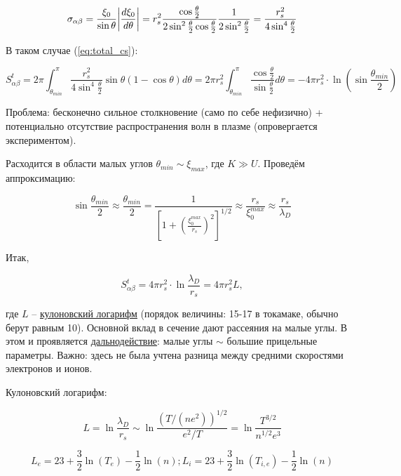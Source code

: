 \documentclass[10pt, a4paper]{article}
\numberwithin{equation}{section}
\begin{document}
\begin{equation*}
	\sigma_{\alpha\beta} = \frac{\xi_0}{\sin\theta}\abs{\frac{d\xi_0}{d\theta}} = r_s^2\frac{\cos\frac{\theta}{2}}{2\sin^2\frac{\theta}{2}\cos\frac{\theta}{2}}\frac{1}{2\sin^2\frac{\theta}{2}} = \frac{r_s^2}{4\sin^4\frac{\theta}{2}}
\end{equation*}

В таком случае (\ref{eq:total_cs}):

\begin{equation*}
	S_{\alpha\beta}^t = 2\pi\int_{\theta_{min}}^{\pi}\frac{r_s^2}{4\sin^4\frac{\theta}{2}}\sin\theta(1-\cos\theta)d\theta = 2\pi r_s^2\int_{\theta_{min}}^{\pi} \frac{\cos\frac{\theta}{2}}{\sin\frac{\theta}{2}}d\theta = -4\pi r_s^2 \cdot \ln\left( \sin\frac{\theta_{min}}{2}\right) 
\end{equation*}

Проблема: бесконечно сильное столкновение (само по себе нефизично) + потенциально отсутствие распространения волн в плазме (опровергается экспериментом).

Расходится в области малых углов $\theta_{min}\sim\xi_{max}$, где $K\gg U$. Проведём аппроксимацию:

\begin{equation*}
	\sin\frac{\theta_{min}}{2}\approx \frac{\theta_{min}}{2} = \frac{1}{\left[ 1+\left( \frac{\xi_0^{max}}{r_s}\right)^2 \right]^{1/2}} \approx \frac{r_s}{\xi_0^{max}} \approx \frac{r_s}{\lambda_D}
\end{equation*}

Итак, 

\begin{equation*}
	S_{\alpha\beta}^t = 4\pi r_s^2 \cdot \ln\frac{\lambda_D}{r_s} = 4\pi r_s^2 L,
\end{equation*}

где $L$ -- \uline{кулоновский логарифм} (порядок величины: 15-17 в токамаке, обычно берут равным 10). Основной вклад в сечение дают рассеяния на малые углы. В этом и проявляется \uline{дальнодействие}: малые углы $\sim$ большие прицельные параметры. Важно: здесь не была учтена разница между средними скоростями электронов и ионов.

Кулоновский логарифм:

\begin{equation*}
	L = \ln\frac{\lambda_D}{r_s} \sim \ln\frac{(T/(ne^2))^{1/2}}{e^2/T} = \ln\frac{T^{3/2}}{n^{1/2}e^3}
\end{equation*}

\begin{equation} \label{eq:Coulomb_log}
	L_e = 23+\frac{3}{2}\ln(T_e)-\frac{1}{2}\ln(n); L_i = 23+
	\frac{3}{2}\ln(T_{i,e})-\frac{1}{2}\ln(n)
\end{equation}
\end{document}

